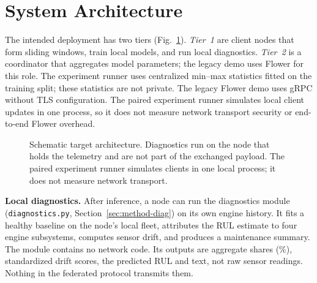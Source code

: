 \section{System Architecture}
\label{sec:arch}
The intended deployment has two tiers (Fig.~\ref{fig:arch}). \emph{Tier~1} are client nodes that form sliding windows, train local models, and run local diagnostics. \emph{Tier~2} is a coordinator that aggregates model parameters; the legacy demo uses Flower for this role. The experiment runner uses centralized min--max statistics fitted on the training split; these statistics are not private. The legacy Flower demo uses gRPC without TLS configuration. The paired experiment runner simulates local client updates in one process, so it does not measure network transport security or end-to-end Flower overhead.

\begin{figure}[t]
\centering
{}
\caption{Schematic target architecture. Diagnostics run on the node that holds the telemetry and are not part of the exchanged payload. The paired experiment runner simulates clients in one local process; it does not measure network transport.}
\label{fig:arch}
\end{figure}

\textbf{Local diagnostics.} After inference, a node can run the diagnostics module (\texttt{diagnostics.py}, Section~\ref{sec:method-diag}) on its own engine history. It fits a healthy baseline on the node's local fleet, attributes the RUL estimate to four engine subsystems, computes sensor drift, and produces a maintenance summary. The module contains no network code. Its outputs are aggregate shares (\%), standardized drift scores, the predicted RUL and text, not raw sensor readings. Nothing in the federated protocol transmits them.

